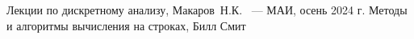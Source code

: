 \begin{thebibliography}{99}
 Лекции по дискретному анализу, Макаров\, Н.К. ~--- МАИ, осень 2024 г.
 Методы и алгоритмы вычисления на строках, Билл Смит
\end{thebibliography}
\pagebreak


